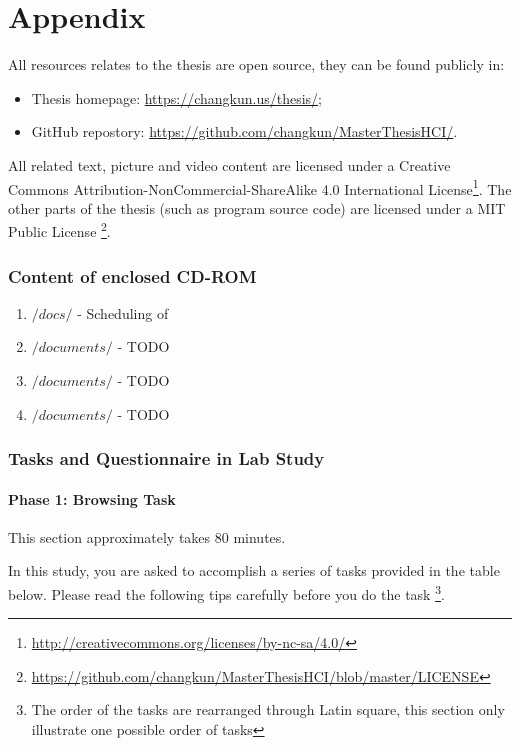 \part*{Appendix}
\appendix
{}
\fancyhead[LE,RO,LO,RE]{} %

All resources relates to the thesis are open source, 
they can be found publicly in:

\begin{itemize}
    \item Thesis homepage: \url{https://changkun.us/thesis/};
    \item GitHub repostory: \url{https://github.com/changkun/MasterThesisHCI/}.
\end{itemize}

All related text, picture and video content are licensed under a 
Creative Commons Attribution-NonCommercial-ShareAlike 4.0 International 
License\footnote{\url{http://creativecommons.org/licenses/by-nc-sa/4.0/}}.
The other parts of the thesis (such as program source code) are licensed 
under a MIT Public License
\footnote{\url{https://github.com/changkun/MasterThesisHCI/blob/master/LICENSE}}.

\section{Content of enclosed CD-ROM}
\label{appendix:a}

\begin{enumerate}
    \item $/docs/$ - Scheduling of 
    \item $/documents/$ - TODO
    \item $/documents/$ - TODO
    \item $/documents/$ - TODO
\end{enumerate}


\section{Tasks and Questionnaire in Lab Study}
\label{appendix:b}

\subsection{Phase 1: Browsing Task}

This section approximately takes 80 minutes.

In this study, you are asked to accomplish a series of tasks provided in the table below.
Please read the following tips carefully before you do the task \footnote{The order of the tasks
are rearranged through Latin square, this section only illustrate one possible order of tasks}.

